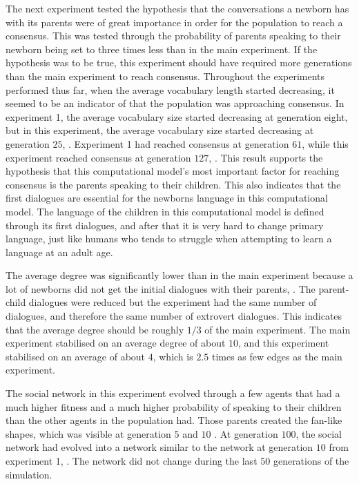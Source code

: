 The next experiment tested the hypothesis that the conversations a newborn has with its parents were of great importance in order for the population to reach a consensus. This was tested through the probability of parents speaking to their newborn being set to three times less than in the main experiment. If the hypothesis was to be true, this experiment should have required more generations than the main experiment to reach consensus. Throughout the experiments performed thus far, when the average vocabulary length started decreasing, it seemed to be an indicator of that the population was approaching consensus. In experiment 1, the average vocabulary size started decreasing at generation eight, but in this experiment, the average vocabulary size started decreasing at generation $25$, . Experiment 1 had reached consensus at generation $61$, while this experiment reached consensus at generation $127$, . This result supports the hypothesis that this computational model's most important factor for reaching consensus is the parents speaking to their children. This also indicates that the first dialogues are essential for the newborns language in this computational model. The language of the children in this computational model is defined through its first dialogues, and after that it is very hard to change primary language, just like humans who tends to struggle when attempting to learn a language at an adult age. 

The average degree was significantly lower than in the main experiment because a lot of newborns did not get the initial dialogues with their parents, . The parent-child dialogues were reduced but the experiment had the same number of dialogues, and therefore the same number of extrovert dialogues. This indicates that the average degree should be roughly $1/3$ of the main experiment. The main experiment stabilised on an average degree of about $10$, and this experiment stabilised on an average of about $4$, which is $2.5$ times as few edges as the main experiment.

The social network in this experiment evolved through a few agents that had a much higher fitness and a much higher probability of speaking to their children than the other agents in the population had. Those parents created the fan-like shapes, which was visible at generation $5$ and $10$ . At generation $100$, the social network had evolved into a network similar to the network at generation $10$ from experiment 1, . The network did not change during the last $50$ generations of the simulation. 

